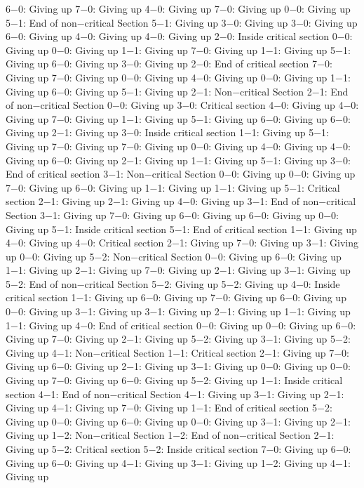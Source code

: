 6−0: Giving up
7−0: Giving up
4−0: Giving up
7−0: Giving up
0−0: Giving up
5−1: End of non−critical Section
5−1: Giving up
3−0: Giving up
3−0: Giving up
6−0: Giving up
4−0: Giving up
4−0: Giving up
2−0: Inside critical section
0−0: Giving up
0−0: Giving up
1−1: Giving up
7−0: Giving up
1−1: Giving up
5−1: Giving up
6−0: Giving up
3−0: Giving up
2−0: End of critical section
7−0: Giving up
7−0: Giving up
0−0: Giving up
4−0: Giving up
0−0: Giving up
1−1: Giving up
6−0: Giving up
5−1: Giving up
2−1: Non−critical Section
2−1: End of non−critical Section
0−0: Giving up
3−0: Critical section
4−0: Giving up
4−0: Giving up
7−0: Giving up
1−1: Giving up
5−1: Giving up
6−0: Giving up
6−0: Giving up
2−1: Giving up
3−0: Inside critical section
1−1: Giving up
5−1: Giving up
7−0: Giving up
7−0: Giving up
0−0: Giving up
4−0: Giving up
4−0: Giving up
6−0: Giving up
2−1: Giving up
1−1: Giving up
5−1: Giving up
3−0: End of critical section
3−1: Non−critical Section
0−0: Giving up
0−0: Giving up
7−0: Giving up
6−0: Giving up
1−1: Giving up
1−1: Giving up
5−1: Critical section
2−1: Giving up
2−1: Giving up
4−0: Giving up
3−1: End of non−critical Section
3−1: Giving up
7−0: Giving up
6−0: Giving up
6−0: Giving up
0−0: Giving up
5−1: Inside critical section
5−1: End of critical section
1−1: Giving up
4−0: Giving up
4−0: Critical section
2−1: Giving up
7−0: Giving up
3−1: Giving up
0−0: Giving up
5−2: Non−critical Section
0−0: Giving up
6−0: Giving up
1−1: Giving up
2−1: Giving up
7−0: Giving up
2−1: Giving up
3−1: Giving up
5−2: End of non−critical Section
5−2: Giving up
5−2: Giving up
4−0: Inside critical section
1−1: Giving up
6−0: Giving up
7−0: Giving up
6−0: Giving up
0−0: Giving up
3−1: Giving up
3−1: Giving up
2−1: Giving up
1−1: Giving up
1−1: Giving up
4−0: End of critical section
0−0: Giving up
0−0: Giving up
6−0: Giving up
7−0: Giving up
2−1: Giving up
5−2: Giving up
3−1: Giving up
5−2: Giving up
4−1: Non−critical Section
1−1: Critical section
2−1: Giving up
7−0: Giving up
6−0: Giving up
2−1: Giving up
3−1: Giving up
0−0: Giving up
0−0: Giving up
7−0: Giving up
6−0: Giving up
5−2: Giving up
1−1: Inside critical section
4−1: End of non−critical Section
4−1: Giving up
3−1: Giving up
2−1: Giving up
4−1: Giving up
7−0: Giving up
1−1: End of critical section
5−2: Giving up
0−0: Giving up
6−0: Giving up
0−0: Giving up
3−1: Giving up
2−1: Giving up
1−2: Non−critical Section
1−2: End of non−critical Section
2−1: Giving up
5−2: Critical section
5−2: Inside critical section
7−0: Giving up
6−0: Giving up
6−0: Giving up
4−1: Giving up
3−1: Giving up
1−2: Giving up
4−1: Giving up

